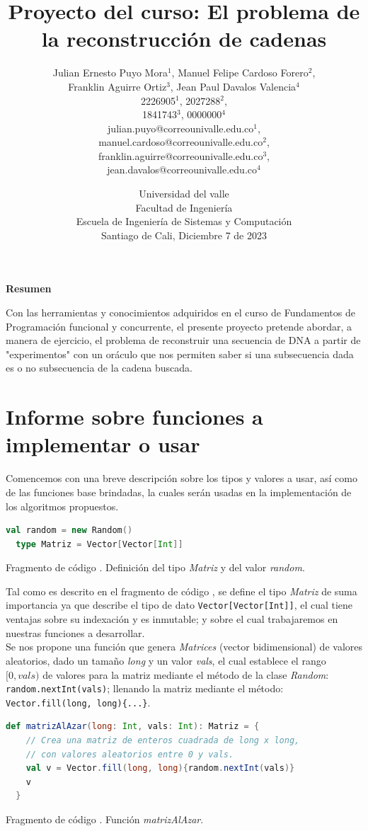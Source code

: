 \documentclass{article}
\title{\textbf{Proyecto del curso: El problema de la reconstrucción de cadenas}}
\author{Julian Ernesto Puyo Mora$^1$,
        Manuel Felipe Cardoso Forero$^2$,\\
        Franklin Aguirre Ortiz$^3$,
        Jean Paul Davalos Valencia$^4$\\        
        2226905$^1$, 2027288$^2$,\\
        1841743$^3$, 0000000$^4$\\
        julian.puyo@correounivalle.edu.co$^1$,\\ 
        manuel.cardoso@correounivalle.edu.co$^2$,\\
        franklin.aguirre@correounivalle.edu.co$^3$,\\
        jean.davalos@correounivalle.edu.co$^4$\\}
\date{Universidad del valle\\ Facultad de Ingeniería\\ Escuela de Ingeniería de Sistemas y Computación\\
Santiago de Cali, Diciembre 7 de 2023}
\newcounter{codesnippet}
\newcommand{\newcodesnippet}{%
  \stepcounter{codesnippet}%
}
\begin{document}
\maketitle

\begin{center}
{\bf \large Resumen}\\
\end{center}

Con las herramientas y conocimientos adquiridos en el curso de Fundamentos de Programación funcional y concurrente, el presente proyecto pretende abordar, a manera de ejercicio, el problema de reconstruir una secuencia de DNA a partir de "experimentos" con un oráculo que nos permiten saber si una subsecuencia dada es o no subsecuencia de la cadena buscada.

\section{Informe sobre funciones a implementar o usar}

Comencemos con una breve descripción sobre los tipos y valores a usar, así como de las funciones base brindadas, la cuales serán usadas en la implementación de los algoritmos propuestos.

\newcodesnippet
\begin{lstlisting}[language=Scala]
  val random = new Random()
  type Matriz = Vector[Vector[Int]]
\end{lstlisting}
\begin{center}
    \small{Fragmento de código \thecodesnippet. Definición del tipo \textit{Matriz} y del valor \textit{random}.}
\end{center}

Tal como es descrito en el fragmento de código \thecodesnippet, se define el tipo \textit{Matriz} de suma importancia ya que describe el tipo de dato \verb|Vector[Vector[Int]]|, el cual tiene ventajas sobre su indexación y es inmutable; y sobre el cual trabajaremos en nuestras funciones a desarrollar. \\

Se nos propone una función que genera \textit{Matrices} (vector bidimensional) de valores aleatorios, dado un tamaño \textit{long} y un valor \textit{vals}, el cual establece el rango \([0,vals)\) de valores para la matriz mediante el método de la clase \textit{Random}: \verb|random.nextInt(vals)|; llenando la matriz mediante el método: \verb|Vector.fill(long, long){...}|.

\newcodesnippet
\begin{lstlisting}[language=Scala]
  def matrizAlAzar(long: Int, vals: Int): Matriz = {
    // Crea una matriz de enteros cuadrada de long x long,
    // con valores aleatorios entre 0 y vals.
    val v = Vector.fill(long, long){random.nextInt(vals)}
    v
  }
\end{lstlisting}
\begin{center}
    \small{Fragmento de código \thecodesnippet. Función \textit{matrizAlAzar}.}
\end{center}
\end{document}
